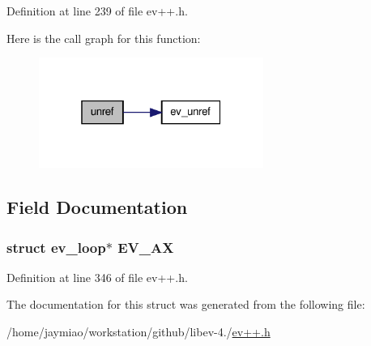 \-Definition at line 239 of file ev++.\-h.



\-Here is the call graph for this function\-:
\nopagebreak
\begin{figure}[H]
\begin{center}
\leavevmode
\includegraphics[width=208pt]{structev_1_1loop__ref_abe058b11156f019666c15a53a3fa7218_cgraph}
\end{center}
\end{figure}




\subsection{\-Field \-Documentation}
\hypertarget{structev_1_1loop__ref_a955b73dc5c60c9d1821e4b9bb19e254c}{
\subsubsection[{\-E\-V\-\_\-\-A\-X}]{\setlength{\rightskip}{0pt plus 5cm}struct {\bf ev\-\_\-loop}$\ast$ {\bf \-E\-V\-\_\-\-A\-X}}}\label{structev_1_1loop__ref_a955b73dc5c60c9d1821e4b9bb19e254c}


\-Definition at line 346 of file ev++.\-h.



\-The documentation for this struct was generated from the following file\-:\begin{DoxyCompactItemize}
\item 
/home/jaymiao/workstation/github/libev-\/4./\hyperlink{ev_09_09_8h}{ev++.\-h}\end{DoxyCompactItemize}
